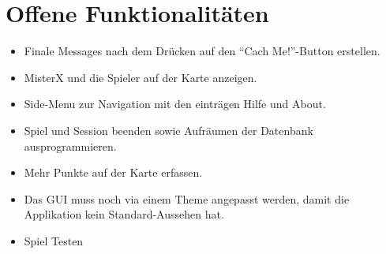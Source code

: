 \documentclass[11pt]{article}
\begin{document}
\section{Offene Funktionalitäten}
\begin{itemize}
\item Finale Messages nach dem Drücken auf den ``Cach Me!''-Button erstellen.
\item MisterX und die Spieler auf der Karte anzeigen.
\item Side-Menu zur Navigation mit den einträgen Hilfe und About.
\item Spiel und Session beenden sowie Aufräumen der Datenbank ausprogrammieren.
\item Mehr Punkte auf der Karte erfassen.
\item Das GUI muss noch via einem Theme angepasst werden, damit die Applikation kein Standard-Aussehen hat.
\item Spiel Testen
\end{itemize}
 
\end{document}
